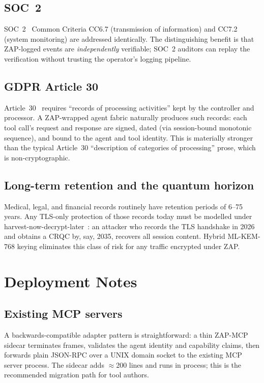 \documentclass[11pt,a4paper]{article}
\theoremstyle{definition}
\theoremstyle{remark}
\newcommand{\zap}{\textsf{ZAP}\xspace}
\newcommand{\zapmcp}{\textsf{ZAP-MCP}\xspace}
\newcommand{\mcp}{\textsf{MCP}\xspace}
\begin{document}
\subsection{SOC~2}

SOC~2~\cite{soc2} Common Criteria CC6.7 (transmission of information)
and CC7.2 (system monitoring) are addressed identically. The
distinguishing benefit is that \zap{}-logged events are
\emph{independently} verifiable; SOC~2 auditors can replay the
verification without trusting the operator's logging pipeline.

\subsection{GDPR Article 30}

Article~30~\cite{gdpr_art30} requires ``records of processing
activities'' kept by the controller and processor. A \zap{}-wrapped
agent fabric naturally produces such records: each tool call's request
and response are signed, dated (via session-bound monotonic sequence),
and bound to the agent and tool identity. This is materially stronger
than the typical Article~30 ``description of categories of processing''
prose, which is non-cryptographic.

\subsection{Long-term retention and the quantum horizon}

Medical, legal, and financial records routinely have retention periods
of 6--75 years. Any TLS-only protection of those records today must be
modelled under harvest-now-decrypt-later~\cite{harvest_now}: an attacker
who records the TLS handshake in 2026 and obtains a CRQC by, say, 2035,
recovers all session content. Hybrid ML-KEM-768 keying eliminates this
class of risk for any traffic encrypted under \zap{}.

\section{Deployment Notes}

\subsection{Existing \mcp{} servers}

A backwards-compatible adapter pattern is straightforward: a thin
\zapmcp{} sidecar terminates frames, validates the agent identity and
capability claims, then forwards plain JSON-RPC over a UNIX domain
socket to the existing \mcp{} server process. The sidecar adds
$\approx$200 lines and runs in process; this is the recommended
migration path for tool authors.
\end{document}
